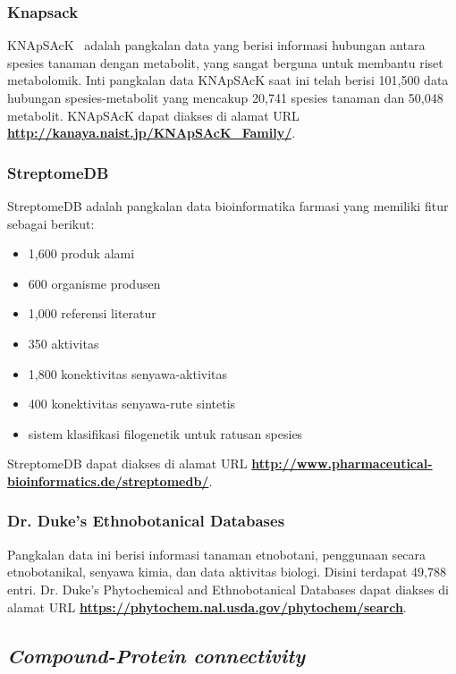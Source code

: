 		\subsubsection{Knapsack} \label{knapsack}
		KNApSAcK~\cite{pmid23292603,} adalah pangkalan data yang berisi informasi hubungan antara spesies tanaman dengan metabolit, yang sangat berguna untuk membantu riset metabolomik. Inti pangkalan data KNApSAcK saat ini telah berisi 101,500 data hubungan spesies-metabolit yang mencakup 20,741 spesies tanaman dan 50,048 metabolit. KNApSAcK dapat diakses di alamat URL \textbf{\url{http://kanaya.naist.jp/KNApSAcK_Family/}}.

		\subsubsection{StreptomeDB} \label{streptome_db}
		StreptomeDB adalah pangkalan data bioinformatika farmasi yang memiliki fitur sebagai berikut:
		\begin{itemize}
		\item 1,600 produk alami
		\item 600 organisme produsen
		\item 1,000 referensi literatur
		\item 350 aktivitas
		\item 1,800 konektivitas senyawa-aktivitas
		\item 400 konektivitas senyawa-rute sintetis
		\item sistem klasifikasi filogenetik untuk ratusan spesies
		\end{itemize}
		StreptomeDB dapat diakses di alamat URL \textbf{\url{http://www.pharmaceutical-bioinformatics.de/streptomedb/}}.

		\subsubsection{Dr. Duke's Ethnobotanical Databases} \label{pedb}
		Pangkalan data ini berisi informasi tanaman etnobotani, penggunaan secara etnobotanikal, senyawa kimia, dan data aktivitas biologi. Disini terdapat 49,788 entri. Dr. Duke's Phytochemical and Ethnobotanical Databases dapat diakses di alamat URL \textbf{\url{https://phytochem.nal.usda.gov/phytochem/search}}.

	\subsection{\emph{Compound-Protein connectivity}}
